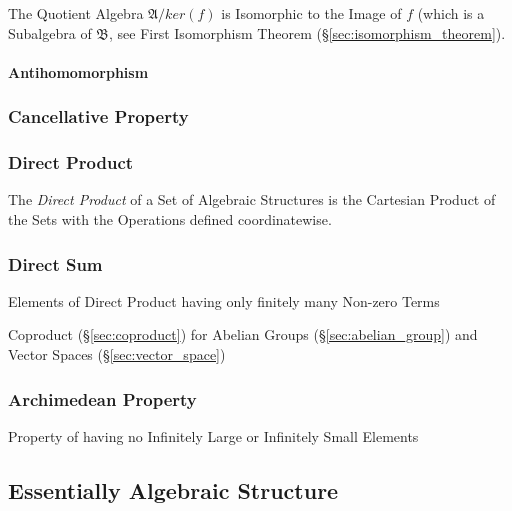 The Quotient Algebra $\mathfrak{A}/ker(f)$ is Isomorphic to the Image
of $f$ (which is a Subalgebra of $\mathfrak{B}$, see First Isomorphism
Theorem (\S\ref{sec:isomorphism_theorem}).



\paragraph{Antihomomorphism}\label{sec:antihomomorphism}



\subsubsection{Cancellative Property}\label{sec:cancellative_property}

\subsubsection{Direct Product}\label{sec:direct_product}

The \emph{Direct Product} of a Set of Algebraic Structures is the
Cartesian Product of the Sets with the Operations defined
coordinatewise.



\subsubsection{Direct Sum}\label{sec:direct_sum}

Elements of Direct Product having only finitely many Non-zero Terms

Coproduct (\S\ref{sec:coproduct}) for Abelian Groups
(\S\ref{sec:abelian_group}) and Vector Spaces
(\S\ref{sec:vector_space})



\subsubsection{Archimedean Property}\label{sec:archimedean_property}

Property of having no Infinitely Large or Infinitely Small Elements



\subsection{Essentially Algebraic Structure}
\label{sec:essentially_algebraic}

